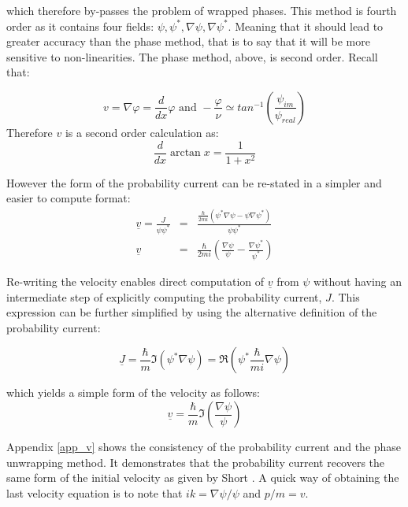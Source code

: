 \noindent which therefore by-passes the problem of wrapped phases. This method is fourth order as it contains four fields: $\psi,\psi^*,\nabla\psi,\nabla\psi^*$. Meaning that it should lead to greater accuracy than the phase method, that is to say that it will be more sensitive to non-linearities. The phase method, above, is second order. Recall that:

\begin{equation}
 v = \nabla \varphi=\frac{d}{dx}\varphi \mbox{ and } -\frac{\varphi}{\nu} \simeq tan^{-1} (\frac{\psi_{im}}{\psi_{real}})
\end{equation}
 \noindent Therefore $v$ is a second order calculation as:
\begin{equation}
\frac{d}{dx} \arctan x = \frac{1}{1 + x^2}
\end{equation}

\noindent However the form of the probability current can be re-stated in a simpler and easier to compute format:
\begin{eqnarray}
 \underline{v} = \frac{J}{\psi\psi^*} &=& \frac{\frac{\hbar}{2mi} (\psi^* \nabla \psi - \psi \nabla \psi^*)}{\psi\psi^*}\\
 \underline{v} &=& \frac{\hbar}{2mi}\left(\frac{\nabla \psi}{\psi} - \frac{\nabla \psi^*}{\psi^*} \right)
\end{eqnarray}

\noindent Re-writing the velocity enables direct computation of $\underline{v}$ from $\psi$ without having an intermediate step of explicitly computing the probability current, $J$. This expression can be further simplified by using the alternative definition of the probability current:

\begin{equation}
\underline{J} = \frac{\hbar}{m} \Im(\psi^* \nabla \psi) = \Re(\psi^* \frac{\hbar}{mi}\nabla \psi)
\end{equation}

\noindent which yields a simple form of the velocity as follows:
\begin{equation}
\label{eqn_svel}
\underline{v} = \frac{\hbar}{m} \Im\left(\frac{\nabla \psi}{\psi}\right)
\end{equation}

\noindent Appendix \ref{app_v} shows the consistency of the probability current and the phase unwrapping method. It demonstrates that the probability current recovers the same form of the initial velocity as given by Short \citep{bib_short}. A quick way of obtaining the last velocity equation is to note that $i k = \nabla \psi / \psi$ and $p/m = v$.


